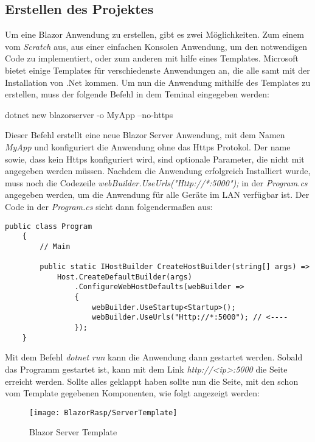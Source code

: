 \subsection{Erstellen des Projektes}
\label{subsec:erstellenProject}
Um eine Blazor Anwendung zu erstellen, gibt es zwei Möglichkeiten. Zum einem vom \emph{Scratch}
aus, aus einer einfachen Konsolen Anwendung, um den notwendigen Code zu implementiert, oder zum
anderen mit hilfe eines Templates. Microsoft bietet einige Templates für verschiedenste
Anwendungen an, die alle samt mit der Installation von .Net kommen.
\newline
\newline
Um nun die Anwendung mithilfe des Templates zu erstellen, muss der folgende Befehl in dem Teminal
eingegeben werden:

\begin{zitat}
    dotnet new blazorserver -o MyApp --no-https
\end{zitat}

Dieser Befehl erstellt eine neue Blazor Server Anwendung, mit dem Namen \emph{MyApp} und
konfiguriert die Anwendung ohne das Https Protokol. Der name sowie, dass kein Https konfiguriert
wird, sind optionale Parameter, die nicht mit angegeben werden müssen. Nachdem die Anwendung 
erfolgreich Installiert wurde, muss noch die Codezeile \emph{webBuilder.UseUrls("Http://*:5000");
} in der \emph{Program.cs} angegeben werden, um die Anwendung für alle Geräte im LAN verfügbar
ist. Der Code in der \emph{Program.cs} sieht dann folgendermaßen aus:

\begin{lstlisting}[language={[Sharp]C}, caption=Program.cs Code,
    label=lst:programCsCode]
    public class Program
    {
        // Main

        public static IHostBuilder CreateHostBuilder(string[] args) =>
            Host.CreateDefaultBuilder(args)
                .ConfigureWebHostDefaults(webBuilder =>
                {
                    webBuilder.UseStartup<Startup>();
                    webBuilder.UseUrls("Http://*:5000"); // <----
                });
    }
\end{lstlisting}

Mit dem Befehl \emph{dotnet run} kann die Anwendung dann gestartet werden. Sobald das Programm
gestartet ist, kann mit dem Link \emph{http://<ip>:5000} die Seite erreicht werden. Sollte alles
geklappt haben sollte nun die Seite, mit den schon vom Template gegebenen Komponenten, wie folgt
angezeigt werden:

\begin{figure}[h]
    \centering
    \texttt{[image: BlazorRasp/ServerTemplate]}
    \caption[Blazor Server Template]{Blazor Server Template}
    \label{img:BlazorServerTemplate}
\end{figure}